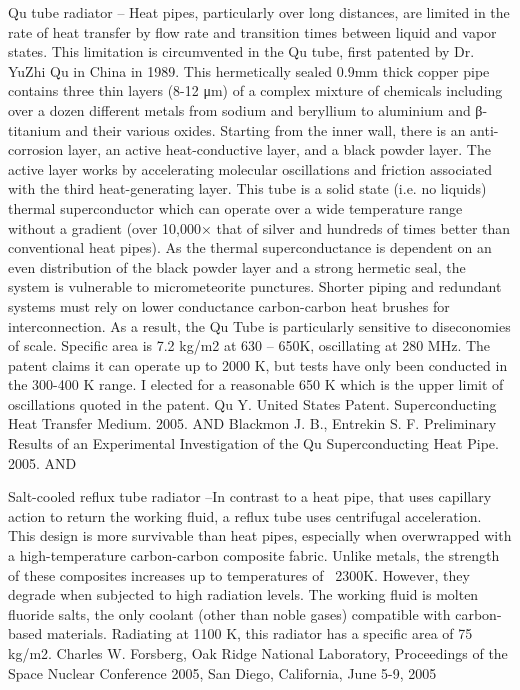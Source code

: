 \documentclass[a4paper]{book}
\begin{document}
Qu tube radiator – Heat pipes, particularly over long distances, are limited in the rate of heat transfer by flow rate and transition times between liquid and vapor states.  This limitation is circumvented in the Qu tube, first patented by Dr. YuZhi Qu in China in 1989. This hermetically sealed 0.9mm thick copper pipe contains three thin layers (8-12 μm) of a complex mixture of chemicals including over a dozen different metals from sodium and beryllium to aluminium and β-titanium and their various oxides.  Starting from the inner wall, there is an anti-corrosion layer, an active heat-conductive layer, and a black powder layer. The active layer works by accelerating molecular oscillations and friction associated with the third heat-generating layer. This tube is a solid state (i.e. no liquids) thermal superconductor which can operate over a wide temperature range without a gradient (over 10,000× that of silver and hundreds of times better than conventional heat pipes).  As the thermal superconductance is dependent on an even distribution of the black powder layer and a strong hermetic seal, the system is vulnerable to micrometeorite punctures.  Shorter piping and redundant systems must rely on lower conductance carbon-carbon heat brushes for interconnection. As a result, the Qu Tube is particularly sensitive to diseconomies of scale. Specific area is 7.2 kg/m2 at 630 – 650K, oscillating at 280 MHz. The patent claims it can operate up to 2000 K, but tests have only been conducted in the 300-400 K range. I elected for a reasonable 650 K which is the upper limit of oscillations quoted in the patent. Qu Y. United States Patent. Superconducting Heat Transfer Medium. 2005. AND Blackmon J. B., Entrekin S. F. Preliminary Results of an Experimental Investigation of the Qu Superconducting Heat Pipe. 2005. AND
 
Salt-cooled reflux tube radiator –In contrast to a heat pipe, that uses capillary action to return the working fluid, a reflux tube uses centrifugal acceleration. This design is more survivable than heat pipes, especially when overwrapped with a high-temperature carbon-carbon composite fabric.  Unlike metals, the strength of these composites increases up to temperatures of ~2300K. However, they degrade when subjected to high radiation levels.  The working fluid is molten fluoride salts, the only coolant (other than noble gases) compatible with carbon-based materials. Radiating at 1100 K, this radiator has a specific area of 75 kg/m2. Charles W. Forsberg, Oak Ridge National Laboratory, Proceedings of the Space Nuclear Conference 2005, San Diego, California, June 5-9, 2005
 
\end{document}

